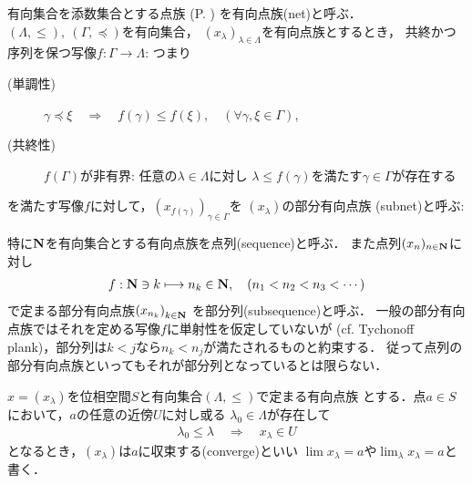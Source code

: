 	\begin{screen}
		\begin{dfn}[有向点族]
			有向集合を添数集合とする点族
			(P. \pageref{dfn:family_collection})
			を有向点族(net)と呼ぶ．
			$(\Lambda,\leq),\ (\Gamma,\preceq)$を有向集合，
			$(x_\lambda)_{\lambda \in \Lambda}$を有向点族とするとき，
			共終かつ序列を保つ写像$f:\Gamma \longrightarrow \Lambda$:
			つまり
			\begin{description}
				\item[(単調性)] $\gamma \preceq \xi \quad \Longrightarrow \quad
					f(\gamma) \leq f(\xi),\quad (\forall \gamma,\xi \in \Gamma)$,
				\item[(共終性)] $f(\Gamma)$が非有界:
					任意の$\lambda \in \Lambda$に対し
					$\lambda \leq f(\gamma)$を満たす$\gamma \in \Gamma$が存在する
			\end{description}
			を満たす写像$f$に対して，$\left(x_{f(\gamma)}\right)_{\gamma \in \Gamma}$を
			$(x_\lambda)$の部分有向点族
			(subnet)と呼ぶ:
		\end{dfn}
	\end{screen}
	特に$\mathbf{N}$を有向集合とする有向点族を点列(sequence)と呼ぶ．
	また点列$(x_n)_{n \in \mathbf{N}}$に対し
	\begin{align}
		f:\mathbf{N} \ni k \longmapsto n_k \in \mathbf{N},
		\quad (n_1 < n_2 < n_3 < \cdots)
	\end{align}
	で定まる部分有向点族$\left(x_{n_k}\right)_{k \in \mathbf{N}}$
	を部分列(subsequence)と呼ぶ．
	一般の部分有向点族ではそれを定める写像$f$に単射性を仮定していないが
	(cf. Tychonoff plank)，部分列は$k < j$なら$n_k < n_j$が満たされるものと約束する．
	従って点列の部分有向点族といってもそれが部分列となっているとは限らない．
	
	\begin{screen}
		\begin{dfn}
			$x = (x_\lambda)$を位相空間$S$と有向集合$(\Lambda,\leq)$で定まる有向点族
			とする．点$a \in S$において，$a$の任意の近傍$U$に対し或る
			$\lambda_0 \in \Lambda$が存在して
			\begin{align}
				\lambda_0 \leq \lambda \quad \Longrightarrow \quad
				x_\lambda \in U
			\end{align}
			となるとき，$(x_\lambda)$は$a$に収束する(converge)といい
			$\lim x_\lambda = a$や$\lim_{\lambda} x_\lambda = a$と書く．
		\end{dfn}
	\end{screen}
	
